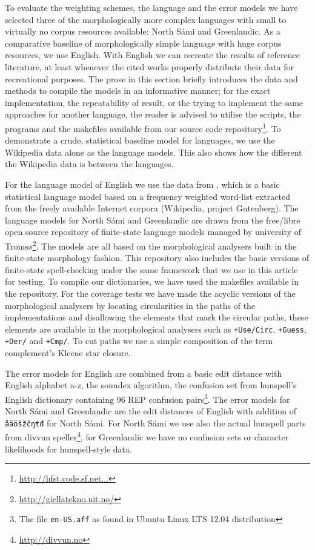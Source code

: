\documentclass[a4paper,12pt]{article}
\begin{document}
To evaluate the weighting schemes, the language and the error models we have
selected three of the morphologically more complex languages with small to
virtually no corpus resources available: North Sámi and Greenlandic.  As a
comparative baseline of morphologically simple language with huge corpus
resources, we use English.  With English we can recreate the results of
reference literature, at least whenever the cited works properly distribute
their data for recreational purposes. The prose in this section briefly
introduces the data and methods to compile the models in an informative manner;
for the exact implementation, the repeatability of result, or the trying to
implement the same approaches for another language, the reader is advised to
utilise the scripts, the programs and the makefiles available from our source
code repository\footnote{\url{http://hfst.code.sf.net...}}.  To demonstrate a
crude, statistical baseline model for languages, we use the Wikipedia data
alone as the language models. This also shows how the different the Wikipedia
data is between the languages.

For the language model of English we use the data from
\cite{norvig/2010,pirinen2012effects}, which is a basic statistical language
model based on a frequency weighted word-list extracted from the freely
available Internet corpora (Wikipedia, project Gutenberg).  The language models
for North Sámi and Greenlandic are drawn from the free/libre open source
repository of finite-state language models managed by university of
Tromsø\footnote{\url{http://giellatekno.uit.no/}}. The models are all based on
the morphological analysers built in the finite-state morphology
\cite[]{beesley2003finite} fashion. This repository also includes the basic
versions of finite-state spell-checking under the same framework that we use in
this article for testing. To compile our dictionaries, we have used the
makefiles available in the repository.  For the coverage tests we have made the
acyclic versions of the morphological analysers by locating circularities in
the paths of the implementations and disallowing the elements that mark the
circular paths, these elements are available in the morphological analysers
such as \texttt{+Use/Circ}, \texttt{+Guess}, \texttt{+Der/} and \texttt{+Cmp/}.
To cut paths we use a simple composition of the term complement's Kleene star
closure.

The error models for English are combined from a basic edit distance with
English alphabet a-z, the soundex algorithm, the confusion set from hunspell's
English dictionary containing 96 REP confusion pairs\footnote{The file
\texttt{en-US.aff} as found in Ubuntu Linux LTS 12.04 distribution}. The error
models for North Sámi and Greenlandic are the edit distances of English with
addition of \texttt{åäöšžčŋŧđ} for North Sámi. For North Sámi we use also the
actual hunspell parts from divvun speller\footnote{\url{http://divvun.no}}, for
Greenlandic we have no confusion sets or character likelihoods for
hunspell-style data.
\end{document}
